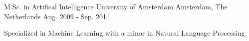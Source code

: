 

\begin{cventries}

  \cventry
    {M.Sc. in Artifical Intelligence} %
    {University of Amsterdam} %
    {Amsterdam, The Netherlands} %
    {Aug. 2009 - Sep. 2011} %
    {
      \begin{cvitems} %
        \item {Specialized in Machine Learning with a minor in Natural Language Processing}
      \end{cvitems}
    }

\end{cventries}
